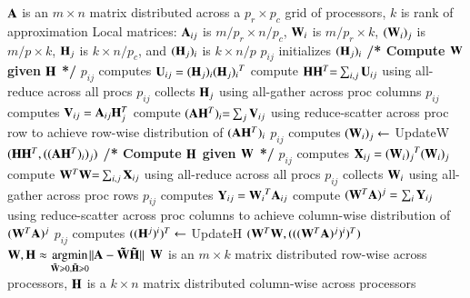 \begin{algorithm}[t!]
\caption{$[\WW,\HH] = \text{\ParNMF}(\AA,k)$}
\label{alg:2D}
\begin{algorithmic}[1]
\small
\Require $\AA$ is an $m\times n$ matrix distributed across a $p_r\times p_c$ grid of processors, $k$ is rank of approximation
\Require Local matrices: $\AA_{ij}$ is $m/p_r\times n/p_c$, $\WW_i$ is $m/p_r\times k$, $(\WW_i)_j$ is $m/p\times k$, $\HH_j$ is $k\times n/p_c$, and $(\HH_j)_i$ is $k\times n/p$
\State $p_{ij}$ initializes $(\HH_j)_i$
	\Statex \quad\; \textbf{/* Compute $\WW$ given $\HH$ */} 
	\State $p_{ij}$ computes $\M{U}_{ij}=(\HH_j)_i{(\HH_j)_i}^T$
		\label{line:2DsyrkH}
	\State compute $\HH\HH^T {=} \sum_{i,j} \M{U}_{ij}$ using all-reduce across all procs
		\label{line:2Dall-reduceH}
	\State $p_{ij}$ collects $\HH_j$ using all-gather across proc columns
		\label{line:2Dall-gatherH}
	\State $p_{ij}$ computes $\M{V}_{ij}=\AA_{ij}\HH_j^T$
		\label{line:2DNEW}
	\State compute $(\AA\HH^T)_i {=} \sum_j \M{V}_{ij}$ using reduce-scatter across proc row to achieve row-wise distribution of $(\AA\HH^T)_i$
		\label{line:2Dreduce-scatterAHT}
	\State $p_{ij}$ computes $(\WW_i)_j \gets$ UpdateW $(\HH\HH^T,((\AA\HH^T)_i)_j)$
		\label{line:2DcompW}
	\Statex \quad\; \textbf{/* Compute $\HH$ given $\WW$ */}
	\State $p_{ij}$ computes $\M{X}_{ij}={(\WW_i)_j}^T(\WW_i)_j$
		\label{line:2DsyrkW}
	\State compute $\WW^T\WW {=} \sum_{i,j} \M{X}_{ij}$ using all-reduce across all procs
		\label{line:2Dall-reduceW}
	\State $p_{ij}$ collects $\WW_i$ using all-gather across proc rows
		\label{line:2Dall-gatherW}
	\State $p_{ij}$ computes $\M{Y}_{ij}={\WW_i}^T\AA_{ij}$
		\label{line:2DNEH}
	\State compute $(\WW^T\AA)^j = \sum_i \M{Y}_{ij}$ using reduce-scatter across proc columns to achieve column-wise distribution of $(\WW^T\AA)^j$
		\label{line:2Dreduce-scatterWTA}
	\State $p_{ij}$ computes $((\HH^j)^i)^T \gets$ UpdateH $(\WW^T\WW,(((\WW^T\AA)^j)^i)^T)$
		\label{line:2DcompH}
\EndWhile
\Ensure $\displaystyle \WW, \HH \approx \Argmin{\M{\tilde W} \geq 0, \M{\tilde H} \geq 0} \|\AA- \M{\tilde W} \M{\tilde H}\|$
\Ensure $\WW$ is an $m\times k$ matrix distributed row-wise across processors, $\HH$ is a $k\times n$ matrix distributed column-wise across processors
\normalsize
\end{algorithmic}
\end{algorithm}

